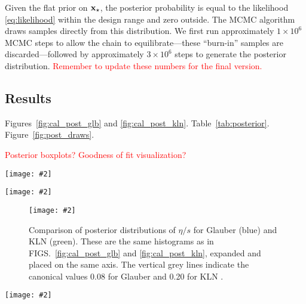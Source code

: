 \documentclass[aps,prc,reprint,amsmath]{revtex4-1}
\newcommand{\todo}[1]{\textcolor{red}{#1}}
\newcommand{\colfig}[3][t]{
  \begin{figure}[#1]
    \texttt{[image: \#2]}
    \caption{\label{fig:#2}#3}
  \end{figure}
}
\newcommand{\widefig}[3][t]{
  \begin{figure*}[#1]
    \texttt{[image: \#2]}
    \caption{\label{fig:#2}#3}
  \end{figure*}
}
\begin{document}
Given the flat prior on $\mathbf x_\star$, the posterior probability is equal to the likelihood \eqref{eq:likelihood} within the design range and zero outside.
The MCMC algorithm draws samples directly from this distribution.
We first run approximately $1 \times 10^6$ MCMC steps to allow the chain to equilibrate---these ``burn-in'' samples are discarded---followed by approximately $3 \times 10^6$ steps to generate the posterior distribution.
\todo{Remember to update these numbers for the final version.}

\subsection{Results}

\cite{Abelev:2014mda}
\cite{Shen:2011zc,Heinz:2011kt}

Figures~\ref{fig:cal_post_glb} and \ref{fig:cal_post_kln}.
Table~\ref{tab:posterior}.
Figure~\ref{fig:post_draws}.

\todo{
  Posterior boxplots?
  Goodness of fit visualization?
}

\widefig{cal_post_glb}{
  Posterior marginal and joint distributions of the calibration parameters for the Glauber model.
  On the diagonal are histograms of MCMC samples for the respective parameters,
  on the lower triangle are two-dimensional histograms of MCMC samples showing the correlation between pairs of parameters,
  and on the upper triangle are approximate contours for 68\%, 95\%, and 99\% confidence intervals along with a dot indicating the median.
}

\widefig{cal_post_kln}{
  Same as FIG.~\ref{fig:cal_post_glb} for the KLN model.
}

\colfig{post_compare}{
  Comparison of posterior distributions of $\eta/s$ for Glauber (blue) and KLN (green).
  These are the same histograms as in FIGS.~\ref{fig:cal_post_glb} and \ref{fig:cal_post_kln}, expanded and placed on the same axis.
  The vertical grey lines indicate the canonical values 0.08 for Glauber and 0.20 for KLN \cite{}.
}

\begin{table*}
  \caption{
    \label{tab:posterior}
    Quantitative summary of posterior distributions.
    For each parameter, the initially guessed value \todo{[cite somehow]}, mean, median, and confidence intervals are given.
  }
  
\end{table*}

\widefig{post_draws}{
  Random realizations of the calibrated posterior for Glauber (top, blue) and KLN (bottom, green) initial conditions.
  Similar to FIG.~\ref{fig:prior_draws},
  except the lines are posterior emulator predictions instead of explicit prior calculations.
}
\end{document}
